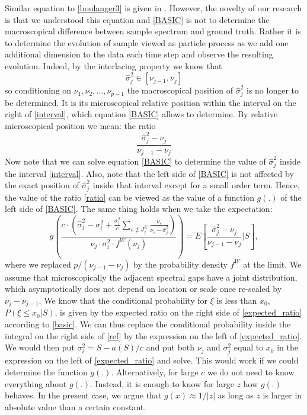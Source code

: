 \documentclass[12pt]{amsart}
\theoremstyle{definition}
\numberwithin{equation}{section}
\numberwithin{equation}{section}
\theoremstyle{remark}
\numberwithin{equation}{section}
\begin{document}
Similar equation to \ref{boulanger3} is given in \cite{amsalu2018recovery}. However,
the novelty of our research is that we understood this equation and \ref{BASIC} is not to determine the macroscopical difference
between sample spectrum and ground truth. Rather it is to determine the evolution of sample viewed as particle process as we add one additional dimension to the data each time step and observe the resulting evolution. Indeed, by the interlacing property we know that
\begin{equation}
\label{interval}
\hat{\sigma}^2_j\in[\nu_{j-1},\nu_j]
\end{equation}
so conditioning on $\nu_1,\nu_2,\ldots,\nu_{p-1}$ the macroscopical position of $\hat{\sigma}^2_j$ is no longer to be determined.
It is its microscopical relative position within the interval on the right of \ref{interval},
which equation \ref{BASIC} allows to determine. By relative microscopical position we mean:
the ratio \begin{equation}
\label{ratio}
\frac{\hat{\sigma}^2_j-\nu_j}{\nu_{j-1}-\nu_j}
\end{equation}
Now note that we can solve equation \ref{BASIC} to determine the value of $\hat{\sigma}^2_j$ inside the interval \ref{interval}.
Also, note that the left side  of \ref{BASIC} is not affected by the exact position of $\hat{\sigma}^2_j$ inside that interval
except for a small order term. Hence, the value of the ratio \ref{ratio} can be viewed as the value of a function $g(.)$
of the left side of \ref{BASIC}. The same thing holds when we take the expectation:
\begin{equation}
\label{expected_ratio}
g\left(\frac{c\cdot(\hat{\sigma}^2_j-\sigma^2_i+\frac{\sigma^2_i}{c}
	\sum_{s\notin J^K_j} \frac{\nu_s}{\nu_s-\hat{\sigma}^2_j})}{\nu_j\cdot \sigma^2_i\cdot f^W(\nu_j)}\right)=
E\left[\frac{\hat{\sigma}^2_j-\nu_j}{\nu_{j-1}-\nu_j}|S\right],
\end{equation}
where we replaced $p/(\nu_{j-1}-\nu_j)$ by the probability density $f^W$ at the limit. We assume that microscopically the adjacent spectral gaps have a joint distribution, which
asymptotically does not depend on location or scale once re-scaled by $\nu_j-\nu_{j-1}$. We know that the conditional probability for $\xi$ is less than $x_0$, $P(\xi\leq x_0|S)$, is given by the expected ratio on the right side of \ref{expected_ratio} according to \ref{basic}. We can thus replace the conditional probability inside the integral on the right side of \ref{ref} by the expression on the left of \ref{expected_ratio}. We would then put $\sigma_i^2=S-a(S)/c$ and put both $\nu_j$ and $\sigma^2_j$ equal to $x_0$
in the expression on the left of \ref{expected_ratio} and solve. This would work if we could determine the function $g(.)$. Alternatively, for large $c$ we do not need to know everything about $g(.)$. Instead, it is enough to know for large $z$ how $g(.)$ behaves. In the present case, we argue that $g(x)\approx 1/|z|$ as long as $z$ is larger in absolute value than a certain constant.
\end{document}
